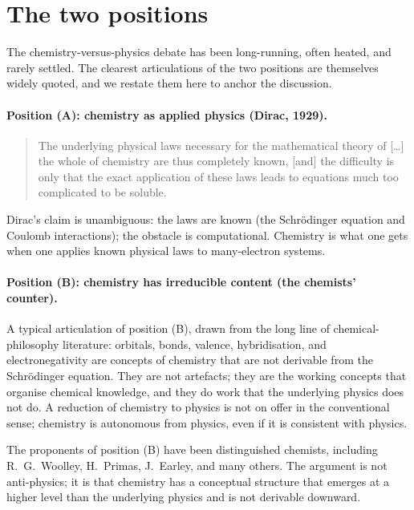 \section{The two positions}\label{sec:two-positions}

The chemistry-versus-physics debate has been long-running, often heated, and rarely settled. The clearest articulations of the two positions are themselves widely quoted, and we restate them here to anchor the discussion.

\paragraph{Position (A): chemistry as applied physics (Dirac, 1929).}
\begin{quote}
The underlying physical laws necessary for the mathematical theory of [\ldots] the whole of chemistry are thus completely known, [and] the difficulty is only that the exact application of these laws leads to equations much too complicated to be soluble.
\end{quote}
Dirac's claim is unambiguous: the laws are known (the Schr\"odinger equation and Coulomb interactions); the obstacle is computational. Chemistry is what one gets when one applies known physical laws to many-electron systems.

\paragraph{Position (B): chemistry has irreducible content (the chemists' counter).}
A typical articulation of position (B), drawn from the long line of chemical-philosophy literature: orbitals, bonds, valence, hybridisation, and electronegativity are concepts of chemistry that are not derivable from the Schr\"odinger equation. They are not artefacts; they are the working concepts that organise chemical knowledge, and they do work that the underlying physics does not do. A reduction of chemistry to physics is not on offer in the conventional sense; chemistry is autonomous from physics, even if it is consistent with physics.

The proponents of position (B) have been distinguished chemists, including R.~G.~Woolley, H.~Primas, J.~Earley, and many others. The argument is not anti-physics; it is that chemistry has a conceptual structure that emerges at a higher level than the underlying physics and is not derivable downward.

